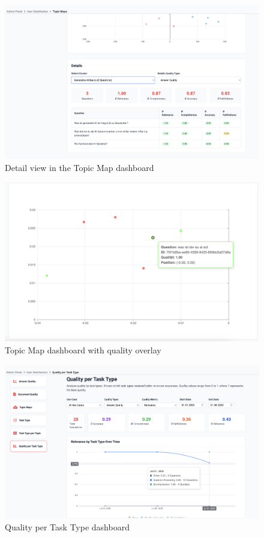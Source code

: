 \documentclass[
	english,
	ruledheaders=section,%
	class=report,%
	thesis={type=bachelor},%
	accentcolor=1b,%
	custommargins=true,%
	marginpar=false,%
	parskip=half-,%
	fontsize=11pt,%
	DIV=14,
]{tudapub}
\begin{document}
\begin{figure}[h!]
    \centering
    \includegraphics[width=0.75\linewidth]{images/TopicMapsDetails.png}
    \captionsetup{list=no}
    \caption{Detail view in the Topic Map dashboard}
    \label{fig:topic_maps_details}
\end{figure}

\begin{figure}[h!]
    \centering
    \includegraphics[width=0.75\linewidth]{images/TopicMapsQuality.png}
    \captionsetup{list=no}
    \caption{Topic Map dashboard with quality overlay}
    \label{fig:topic_maps_quality}
\end{figure}

\begin{figure}[h!]
    \centering
    \includegraphics[width=0.75\linewidth]{images/QualityPerTaskType.png}
    \captionsetup{list=no}
    \caption{Quality per Task Type dashboard}
    \label{fig:quality_per_task_type}
\end{figure}
\end{document}
